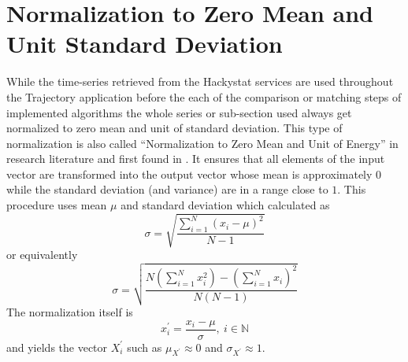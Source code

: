 \section{Normalization to Zero Mean and Unit Standard Deviation} \label{sect:normalization}
While the time-series retrieved from the Hackystat services are used throughout the Trajectory application before the each of the comparison or matching steps of implemented algorithms the whole series or sub-section used always get normalized to zero mean and unit of standard deviation. This type of normalization is also called ``Normalization to Zero Mean and Unit of Energy'' in research literature and first found in \cite{citeulike:3815880}. It ensures that all elements of the input vector are transformed into the output vector whose mean is approximately $0$ while the standard deviation (and variance) are in a range close to $1$.
This procedure uses mean $\mu$ and standard deviation which calculated as 
\begin{equation}
\sigma = \sqrt{ \frac{ \sum_{i=1}^{N} (x_{i} - \mu)^{2} }{ N - 1 } }
\end{equation}
or equivalently
\begin{equation}
\sigma = \sqrt{
	 \frac{
       N \left( \sum_{i=1}^{N} x_{i}^{2}  \right) - 
       \left( \sum_{i=1}^{N} x_{i} \right) ^{2}}
       {N(N-1)}}
\end{equation}
The normalization itself is 
\begin{equation}
x_{i}^{'} = \frac{x_{i} - \mu}{\sigma}, \: i \in \mathbb{N}
\end{equation}
and yields the vector $X_{i}^{'}$ such as $\mu_{X^{'}} \approx 0$ and $\sigma_{X^{'}} \approx 1$.
